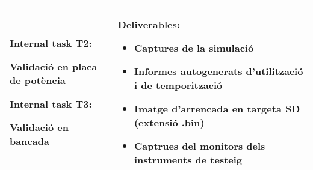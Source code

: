 \begin{center}
\begin{tabular}{| p{8.5cm} | p{5.25cm} |}
            \textbf{Internal task T2:} 
                \newline \hspace*{0.3cm}
                \begin{minipage}[t]{8cm}
                    Validació en placa de potència
                \end{minipage}
                \smallskip

            \textbf{Internal task T3:}
                \newline \hspace*{0.3cm}
                \begin{minipage}[t]{8cm}
                    Validació en bancada
                \end{minipage}
                \smallskip
            & 
            \textbf{ Deliverables: }
                \begin{itemize}
                    \item { Captures de la simulació }
                    \item { Informes autogenerats d'utilització i de temporització }
                    \item { Imatge d'arrencada en targeta SD (extensió .bin) }
                    \item { Captrues del monitors dels instruments de testeig }
                \end{itemize} \\
        \hline
    \end{tabular}
\end{center}



